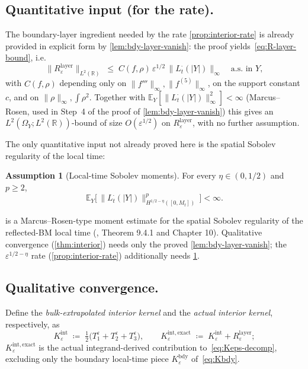 \documentclass[11pt,reqno]{amsart}
\theoremstyle{plain}
\theoremstyle{definition}
\newtheorem{assumption}[theorem]{Assumption}
\theoremstyle{remark}
\newcommand{\R}{\mathbb{R}}
\newcommand{\E}{\mathbb{E}}
\begin{document}
\subsection*{Quantitative input (for the rate).}

The boundary-layer ingredient needed by the rate
\cref{prop:interior-rate} is already provided in explicit form by
\cref{lem:bdy-layer-vanish}: the proof
yields~\eqref{eq:R-layer-bound}, i.e.\
\[
 \|R_{\varepsilon}^{\mathrm{layer}}\|_{L^{2}(\R)}
 \;\le\;C(f,\rho)\,\varepsilon^{1/2}\,\|L_{t}^{\cdot}(|Y|)\|_{\infty}
 \quad\text{a.s.\ in }Y,
\]
with $C(f,\rho)$ depending only on $\|f'''\|_{\infty},\|f^{(5)}\|_{\infty}$,
on the support constant $c$, and on $\|\rho\|_{\infty},\int\rho^{2}$.
Together with $\E_{Y}[\|L_{t}^{\cdot}(|Y|)\|_{\infty}^{2}]<\infty$
(Marcus--Rosen, used in Step~4 of the proof of
\cref{lem:bdy-layer-vanish}) this gives an
$L^{2}(\Omega_{Y};L^{2}(\R))$-bound of size $O(\varepsilon^{1/2})$
on $R_{\varepsilon}^{\mathrm{layer}}$, with no further assumption.

The only quantitative input not already proved here is the spatial
Sobolev regularity of the local time:

\begin{assumption}[Local-time Sobolev moments]\label{assu:lt-moment}
For every $\eta\in(0,1/2)$ and $p\ge 2$,
\[
 \E_{Y}\bigl[\,\|L_{t}^{\cdot}(|Y|)\|_{H^{1/2-\eta}([0,M_{t}])}^{p}\,\bigr]<\infty.
\]
\end{assumption}

 is a Marcus--Rosen-type moment estimate for
the spatial Sobolev regularity of the reflected-BM local time
(\cite{MarcusRosen}, Theorem 9.4.1 and Chapter 10). Qualitative
convergence (\cref{thm:interior}) needs only the proved
\cref{lem:bdy-layer-vanish}; the $\varepsilon^{1/2-\eta}$ rate
(\cref{prop:interior-rate}) additionally needs
\cref{assu:lt-moment}.

\subsection*{Qualitative convergence.}

Define the \emph{bulk-extrapolated interior kernel} and the
\emph{actual interior kernel}, respectively, as
\[
 K_{\varepsilon}^{\mathrm{int}}\;\coloneqq\;\tfrac12\bigl(T_{1}^{\varepsilon}+T_{2}^{\varepsilon}+T_{3}^{\varepsilon}\bigr),
 \qquad
 K_{\varepsilon}^{\mathrm{int,exact}}\;\coloneqq\;K_{\varepsilon}^{\mathrm{int}}+R_{\varepsilon}^{\mathrm{layer}};
\]
$K_{\varepsilon}^{\mathrm{int,exact}}$ is the actual integrand-derived
contribution to~\eqref{eq:Keps-decomp}, excluding only the boundary
local-time piece $K_{\varepsilon}^{\mathrm{bdy}}$ of~\eqref{eq:Kbdy}.
\end{document}
